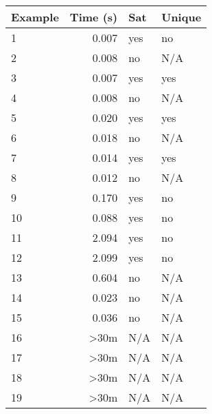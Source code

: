 \documentclass[11pt]{article}
\begin{document}
		\begin{table}[htb]
			\begin{tabular}{|l|l|l|l|}
			\hline
			\textbf{Example} & \textbf{Time (s)}          & \textbf{Sat} & \textbf{Unique} \\ \hline
			1                & \multicolumn{1}{r|}{0.007} & yes          & no              \\
			2				 & \multicolumn{1}{r|}{0.008} & no           & N/A             \\
			3				 & \multicolumn{1}{r|}{0.007} & yes          & yes             \\
			4				 & \multicolumn{1}{r|}{0.008} & no           & N/A             \\
			5				 & \multicolumn{1}{r|}{0.020} & yes          & yes             \\
			6				 & \multicolumn{1}{r|}{0.018} & no           & N/A             \\
			7				 & \multicolumn{1}{r|}{0.014} & yes          & yes             \\
			8				 & \multicolumn{1}{r|}{0.012} & no           & N/A             \\
			9				 & \multicolumn{1}{r|}{0.170} & yes          & no              \\
			10				 & \multicolumn{1}{r|}{0.088} & yes          & no              \\
			11				 & \multicolumn{1}{r|}{2.094} & yes          & no              \\
			12				 & \multicolumn{1}{r|}{2.099} & yes          & no              \\
			13				 & \multicolumn{1}{r|}{0.604} & no           & N/A             \\
			14				 & \multicolumn{1}{r|}{0.023} & no           & N/A             \\
			15				 & \multicolumn{1}{r|}{0.036} & no           & N/A             \\
			16				 & \multicolumn{1}{r|}{\textgreater{}30m} & N/A  & N/A         \\
			17				 & \multicolumn{1}{r|}{\textgreater{}30m} & N/A  & N/A         \\
			18				 & \multicolumn{1}{r|}{\textgreater{}30m} & N/A  & N/A         \\
			19				 & \multicolumn{1}{r|}{\textgreater{}30m} & N/A  & N/A         \\
			\end{tabular}
		\end{table}
\end{document}
